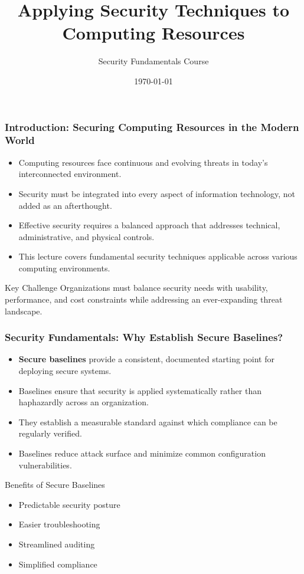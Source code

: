 \documentclass{beamer}
\title{Applying Security Techniques to Computing Resources}
\author{Security Fundamentals Course}
\date{\today}
\begin{document}
\begin{frame}
    \titlepage
\end{frame}

\begin{frame}
    \frametitle{Introduction: Securing Computing Resources in the Modern World}
    
    \begin{itemize}
        \item Computing resources face continuous and evolving threats in today's interconnected environment.
        \item Security must be integrated into every aspect of information technology, not added as an afterthought.
        \item Effective security requires a balanced approach that addresses technical, administrative, and physical controls.
        \item This lecture covers fundamental security techniques applicable across various computing environments.
    \end{itemize}
    
    \begin{alertblock}{Key Challenge}
        Organizations must balance security needs with usability, performance, and cost constraints while addressing an ever-expanding threat landscape.
    \end{alertblock}
\end{frame}

\begin{frame}
    \frametitle{Security Fundamentals: Why Establish Secure Baselines?}
    
    \begin{itemize}
        \item \textbf{Secure baselines} provide a consistent, documented starting point for deploying secure systems.
        \item Baselines ensure that security is applied systematically rather than haphazardly across an organization.
        \item They establish a measurable standard against which compliance can be regularly verified.
        \item Baselines reduce attack surface and minimize common configuration vulnerabilities.
    \end{itemize}
    
    \begin{block}{Benefits of Secure Baselines}
        \begin{itemize}
            \item Predictable security posture
            \item Easier troubleshooting
            \item Streamlined auditing
            \item Simplified compliance
        \end{itemize}
    \end{block}
\end{frame}
\end{document}
